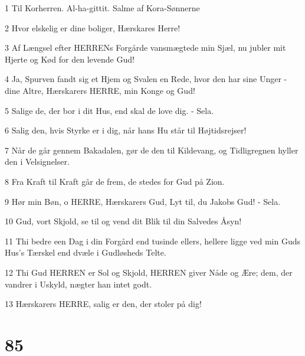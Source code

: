 \par 1 Til Korherren. Al-ha-gittit. Salme af Kora-Sønnerne
\par 2 Hvor elskelig er dine boliger, Hærskares Herre!
\par 3 Af Længsel efter HERRENs Forgårde vansmægtede min Sjæl, nu jubler mit Hjerte og Kød for den levende Gud!
\par 4 Ja, Spurven fandt sig et Hjem og Svalen en Rede, hvor den har sine Unger - dine Altre, Hærskarers HERRE, min Konge og Gud!
\par 5 Salige de, der bor i dit Hus, end skal de love dig. - Sela.
\par 6 Salig den, hvis Styrke er i dig, når hans Hu står til Højtidsrejser!
\par 7 Når de går gennem Bakadalen, gør de den til Kildevang, og Tidligregnen hyller den i Velsignelser.
\par 8 Fra Kraft til Kraft går de frem, de stedes for Gud på Zion.
\par 9 Hør min Bøn, o HERRE, Hærskarers Gud, Lyt til, du Jakobs Gud! - Sela.
\par 10 Gud, vort Skjold, se til og vend dit Blik til din Salvedes Åsyn!
\par 11 Thi bedre een Dag i din Forgård end tusinde ellers, hellere ligge ved min Guds Hus's Tærskel end dvæle i Gudløsheds Telte.
\par 12 Thi Gud HERREN er Sol og Skjold, HERREN giver Nåde og Ære; dem, der vandrer i Uskyld, nægter han intet godt.
\par 13 Hærskarers HERRE, salig er den, der stoler på dig!

\chapter{85}

